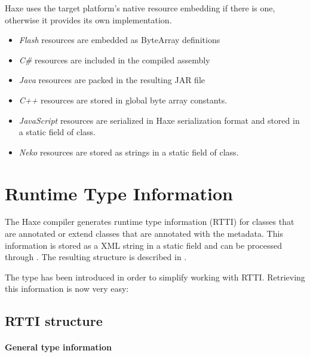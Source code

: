 Haxe uses the target platform's native resource embedding if there is one, otherwise it provides its own implementation.

\begin{itemize}
\item \emph{Flash} resources are embedded as ByteArray definitions
\item \emph{C\#} resources are included in the compiled assembly
\item \emph{Java} resources are packed in the resulting JAR file
\item \emph{C++} resources are stored in global byte array constants.
\item \emph{JavaScript} resources are serialized in Haxe serialization format and stored in a static field of  class.
\item \emph{Neko} resources are stored as strings in a static field of  class.
\end{itemize}



\section{Runtime Type Information}
\label{cr-rtti}

The Haxe compiler generates runtime type information (RTTI) for classes that are annotated or extend classes that are annotated with the  metadata. This information is stored as a XML string in a static field  and can be processed through . The resulting structure is described in .


The type  has been introduced in order to simplify working with RTTI. Retrieving this information is now very easy:


\subsection{RTTI structure}
\label{cr-rtti-structure}

\paragraph{General type information}

